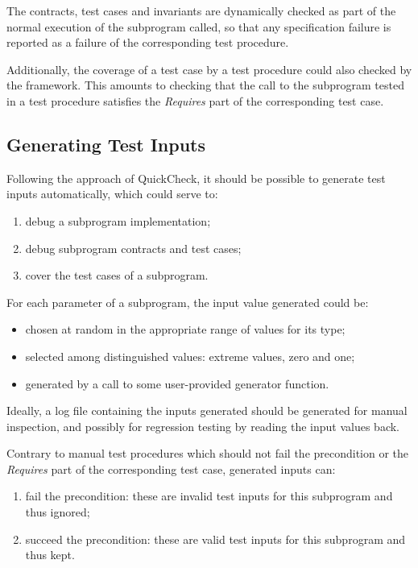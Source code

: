 \documentclass{article}
\begin{document}
The contracts, test cases and invariants are dynamically checked as part of the
normal execution of the subprogram called, so that any specification failure is
reported as a failure of the corresponding test procedure.

Additionally, the coverage of a test case by a test procedure could also
checked by the framework. This amounts to checking that the call to the
subprogram tested in a test procedure satisfies the \textit{Requires} part of
the corresponding test case.

\subsection{Generating Test Inputs}

Following the approach of QuickCheck, it should be possible to generate test
inputs automatically, which could serve to:
\begin{enumerate}
\item debug a subprogram implementation;
\item debug subprogram contracts and test cases;
\item cover the test cases of a subprogram.
\end{enumerate}

For each parameter of a subprogram, the input value generated could be:
\begin{itemize}
\item chosen at random in the appropriate range of values for its type;
\item selected among distinguished values: extreme values, zero and one;
\item generated by a call to some user-provided generator function.
\end{itemize}

Ideally, a log file containing the inputs generated should be generated for
manual inspection, and possibly for regression testing by reading the input
values back.

Contrary to manual test procedures which should not fail the precondition or
the \textit{Requires} part of the corresponding test case, generated inputs
can:
\begin{enumerate}
\item fail the precondition: these are invalid test inputs for this
  subprogram and thus ignored;
\item succeed the precondition: these are valid test inputs for this subprogram
  and thus kept.
\end{enumerate}
\end{document}
